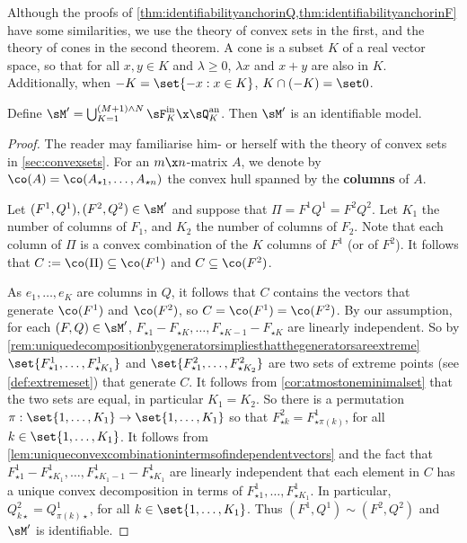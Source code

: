 \documentclass[12pt,a4paper]{article}
\begin{document}
Although the proofs of \cref{thm:identifiabilityanchorinQ,thm:identifiabilityanchorinF} have some similarities, we use the theory of convex sets in the first, and the theory of cones in the second theorem. A cone is a subset $K$ of a real vector space, so that for all $x,y\in K$ and $\lambda\ge 0$, $\lambda x$ and $x+y$ are also in $K$. Additionally, when $-K=\set{-x:x\in K}$,  $K\cap(-K)=\set 0$. 



\begin{theorem}\label{thm:identifiabilityanchorinQ}
   Define $\sM'=\bigcup_{K=1}^{(M+1)\wedge N}\sF_K^{\text{in}}\x \sQ_K^{\text{an}}$. 
    Then $\sM'$ is an identifiable model.  
    \end{theorem} 
\begin{proof}
The reader may familiarise him- or herself with the theory of convex sets in \cref{sec:convexsets}. 
For an $m\x n$-matrix $A$, we denote by $\co(A)=\co(A_{\star 1},\ldots,A_{\star n})$ the convex hull spanned by the \textbf{columns} of $A$.  

Let $(F^1,Q^1),(F^2,Q^2)\in \sM'$ and suppose that $\Pi=F^1Q^1=F^2Q^2$. Let $K_1$ the number of columns of $F_1$, and $K_2$ the number of columns of $F_2$.  
Note that each column of $\Pi$ is a convex combination of the $K$ columns of $F^1$ (or of $F^2$). It follows that $C:=\co(\Pi)\subseteq \co(F^1)$ and $C\subseteq \co(F^2)$. 

 As $e_1,\ldots,e_K$ are columns in $Q$, it follows that $C $ contains the vectors that generate $\co(F^1)$ and $\co(F^2)$, so $C=\co(F^1)=\co(F^2)$.  
By our assumption, for each $(F,Q)\in \sM'$,  $F_{\star 1}-F_{\star K},\ldots,F_{\star K-1}-F_{\star K}$ are linearly independent. So by \cref{rem:uniquedecompositionbygeneratorsimpliesthatthegeneratorsareextreme}  $\set{F_{\star 1}^1,\ldots,F_{\star K_1}^1}$ and $\set{F_{\star 1}^2,\ldots,F_{\star K_2}^2}$ are two sets of extreme points (see \cref{def:extremeset}) that  generate $C$. It follows from \cref{cor:atmostoneminimalset} that the two sets are equal, in particular $K_1=K_2$. So there is a permutation $\pi:\set{1,\ldots,K_1}\to \set{1,\ldots,K_1}$ so that $F_{\star k}^2=F_{\star \pi(k)}^1$, for all $k\in\set{1,\ldots,K_1}$. 
It follows from \cref{lem:uniqueconvexcombinationintermsofindependentvectors} and the fact that $F_{\star 1}^1-F_{\star K_1}^1,\ldots,F_{\star K_1-1}^1-F_{\star K_1}^1$ are linearly independent that each element in $C$ has a unique convex decomposition in terms of $F_{\star 1}^1,\ldots,F_{\star K_1}^1$. In particular, $Q^2_{k\star }=Q^1_{\pi(k)\star }$, for all $k\in\set{1,\ldots,K_1}$. Thus $(F^1,Q^1)\sim (F^2,Q^2)$ and $\sM'$ is identifiable.
\end{proof}
\end{document}
